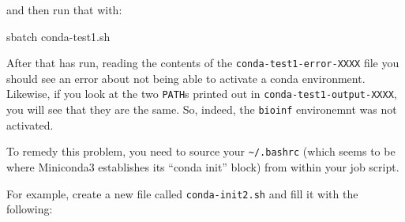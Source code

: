 \documentclass[]{krantz}
\makeatletter
\newenvironment{Shaded}{\begin{snugshade}}{\end{snugshade}}
\newcommand{\BuiltInTok}[1]{#1}
\newcommand{\CommentTok}[1]{\textcolor[rgb]{0.37,0.37,0.37}{\textit{#1}}}
\newcommand{\ExtensionTok}[1]{#1}
\newcommand{\FunctionTok}[1]{\textcolor[rgb]{0,0,0}{#1}}
\newcommand{\NormalTok}[1]{#1}
\newcommand{\StringTok}[1]{\textcolor[rgb]{0.5,0.5,0.5}{#1}}
\newcommand{\VariableTok}[1]{\textcolor[rgb]{0,0,0}{#1}}
\newenvironment{kframe}{%
\medskip{}
\setlength{\fboxsep}{.8em}
 \def\at@end@of@kframe{}%
 \ifinner\ifhmode%
  \def\at@end@of@kframe{\end{minipage}}%
  \begin{minipage}{\columnwidth}%
 \fi\fi%
 \def\FrameCommand##1{\hskip\@totalleftmargin \hskip-\fboxsep
 \colorbox{shadecolor}{##1}\hskip-\fboxsep
     \hskip-\linewidth \hskip-\@totalleftmargin \hskip\columnwidth}%
 \MakeFramed {\advance\hsize-\width
   \@totalleftmargin\z@ \linewidth\hsize
   \@setminipage}}%
 {\par\unskip\endMakeFramed%
 \at@end@of@kframe}
\renewenvironment{Shaded}{\begin{kframe}}{\end{kframe}}
\makeatother
\begin{document}
and then run that with:

\begin{Shaded}
\begin{Highlighting}[]
\ExtensionTok{sbatch}\NormalTok{ conda-test1.sh}
\end{Highlighting}
\end{Shaded}

After that has run, reading the contents of the \texttt{conda-test1-error-XXXX} file you should
see an error about not being able to activate a conda environment. Likewise,
if you look at the two \texttt{PATH}s printed out in \texttt{conda-test1-output-XXXX},
you will see that they are the same. So, indeed, the \texttt{bioinf} environemnt
was not activated.

To remedy this problem, you need to source your \texttt{\textasciitilde{}/.bashrc}
(which seems to be where Miniconda3 establishes its ``conda init'' block)
from within your job script.

For example, create a new file called \texttt{conda-init2.sh} and fill it with
the following:

\begin{Shaded}
\end{Shaded}
\end{document}
